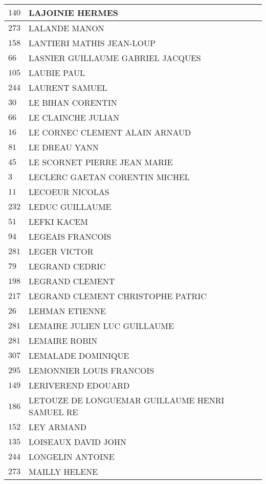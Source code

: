 \begin{xltabular}{\linewidth}{|l|X|}
    \hline
    $140$ & LAJOINIE HERMES \\
    \hline
    $273$ & LALANDE MANON \\
    \hline
    $158$ & LANTIERI MATHIS JEAN-LOUP \\
    \hline
    $66$ & LASNIER GUILLAUME GABRIEL JACQUES \\
    \hline
    $105$ & LAUBIE PAUL \\
    \hline
    $244$ & LAURENT SAMUEL \\
    \hline
    $30$ & LE BIHAN CORENTIN \\
    \hline
    $66$ & LE CLAINCHE JULIAN \\
    \hline
    $16$ & LE CORNEC CLEMENT ALAIN ARNAUD \\
    \hline
    $81$ & LE DREAU YANN \\
    \hline
    $45$ & LE SCORNET PIERRE JEAN MARIE \\
    \hline
    $3$ & LECLERC GAETAN CORENTIN MICHEL \\
    \hline
    $11$ & LECOEUR NICOLAS \\
    \hline
    $232$ & LEDUC GUILLAUME \\
    \hline
    $51$ & LEFKI KACEM \\
    \hline
    $94$ & LEGEAIS FRANCOIS \\
    \hline
    $281$ & LEGER VICTOR \\
    \hline
    $79$ & LEGRAND CEDRIC \\
    \hline
    $198$ & LEGRAND CLEMENT \\
    \hline
    $217$ & LEGRAND CLEMENT CHRISTOPHE PATRIC \\
    \hline
    $26$ & LEHMAN ETIENNE \\
    \hline
    $281$ & LEMAIRE JULIEN LUC GUILLAUME \\
    \hline
    $281$ & LEMAIRE ROBIN \\
    \hline
    $307$ & LEMALADE DOMINIQUE \\
    \hline
    $295$ & LEMONNIER LOUIS FRANCOIS \\
    \hline
    $149$ & LERIVEREND EDOUARD \\
    \hline
    $186$ & LETOUZE DE LONGUEMAR GUILLAUME HENRI SAMUEL RE \\
    \hline
    $152$ & LEY ARMAND \\
    \hline
    $135$ & LOISEAUX DAVID JOHN \\
    \hline
    $244$ & LONGELIN ANTOINE \\
    \hline
    $273$ & MAILLY HELENE \\

\end{xltabular}
